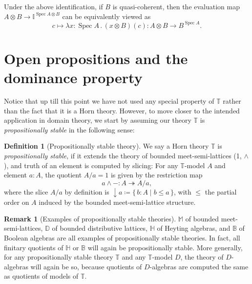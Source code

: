 \documentclass[12pt]{amsart}
\theoremstyle{definition}
\newtheorem{definition}[theorem]{Definition}
\newtheorem{remark}[theorem]{Remark}
\newcommand{\mbb}[1]{\mathbb{#1}}
\newcommand{\T}{\mbb T}
\newcommand{\I}{\mbb I}
\newcommand{\scomp}[2]{\{\,#1\mid#2\,\}}
\newcommand{\surj}{\twoheadrightarrow}
\newcommand{\cv}{\operatorname{\downarrow}}
\newcommand{\ld}[2]{\lambda #1\!\colon\!\!#2\mathpunct{.}}
\newcommand{\spec}{\operatorname{Spec}}
\begin{document}
Under the above identification, if $B$ is quasi-coherent, then the evaluation map $A \otimes B \to \I^{\spec A \otimes B}$ can be equivalently viewed as
\[ c \mapsto \ld{x}{\spec A} (x\otimes B)(c) \colon A \otimes B \to B^{\spec A}. \]


\section{Open propositions and the dominance property}\label{sec:dominance}

Notice that up till this point we have not used any special property of $\T$ rather than the fact that it is a Horn theory. However, to move closer to the intended application in domain theory, we start by assuming our theory $\T$ is \emph{propositionally stable} in the following sense: 

\begin{definition}[Propositionally stable theory]\label{defn:propositional}
  We say a Horn theory $\T$ is \emph{propositionally stable}, if it extends the theory of bounded meet-semi-lattices (1, $\wedge$), and truth of an element is computed by slicing: For any $\T$-model $A$ and element $a:A$, the quotient $A/a=1$ is given by the restriction map
  \[ a \wedge - : A \surj A/a, \]
  where the slice $A/a$ by definition is ${\cv} a \coloneq \scomp{b:A}{b\le a}$, with $\le$ the partial order on $A$ induced by the bounded meet-semi-lattice structure.
\end{definition}


\begin{remark}[Examples of propositionally stable theories]
  $\mbb M$ of bounded meet-semi-lattices, $\mbb D$ of bounded distributive lattices, $\mbb H$ of Heyting algebras, and $\mbb B$ of Boolean algebras are all examples of propositionally stable theories. In fact, all finitary quotients of $\mbb H$ or $\mbb B$ will again be propositionally stable. More generally, for any propositionally stable theory $\T$ and any $\T$-model $D$, the theory of $D$-algebras will again be so, because quotients of $D$-algebras are computed the same as quotients of models of $\T$.
\end{remark}
\end{document}
